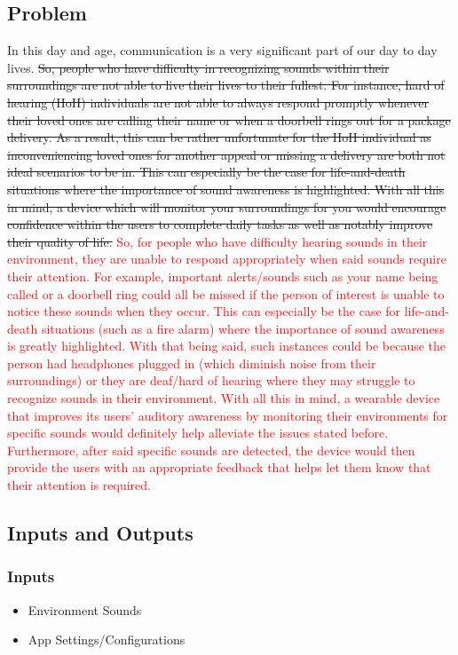 \documentclass[12pt, titlepage]{article}
\begin{document}
\subsection{Problem}
In this day and age, communication is a very significant part of our day to day lives.
\sout{So, people who have difficulty in recognizing sounds within their surroundings are not 
able to live their lives to their fullest. For instance, hard of hearing (HoH) individuals 
are not able to always respond promptly whenever their loved ones are calling their name or
when a doorbell rings out for a package delivery. As a result, this can be rather unfortunate
for the HoH individual as inconveniencing loved ones for another appeal or missing a delivery
are both not ideal scenarios to be in. This can especially be the case for life-and-death 
situations where the importance of sound awareness is highlighted. With all this in mind, 
a device which will monitor your surroundings for you would encourage confidence within 
the users to complete daily tasks as well as notably improve their quality of life.}
\textcolor{red}{So, for people who have difficulty hearing sounds in their environment, they are unable to respond 
appropriately when said sounds require their attention. For example, important alerts/sounds such as 
your name being called or a doorbell ring could all be missed if the person of interest is unable to notice 
these sounds when they occur. This can especially be the case for life-and-death situations (such as a fire alarm) 
where the importance of sound awareness is greatly highlighted. With that being said, such instances could be because 
the person had headphones plugged in (which diminish noise from their surroundings) or they are deaf/hard of hearing 
where they may struggle to recognize sounds in their environment. With all this in mind, a wearable device that improves 
its users' auditory awareness by monitoring their environments for specific sounds would definitely help alleviate the 
issues stated before. Furthermore, after said specific sounds are detected, the device would then provide the users with 
an appropriate feedback that helps let them know that their attention is required.}
\subsection{Inputs and Outputs}

\subsubsection {Inputs}
\begin{itemize}
    \item Environment Sounds
    \item App Settings/Configurations
\end{itemize}
\end{document}
